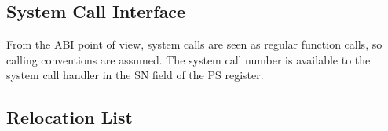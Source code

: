 \subsection{System Call Interface}

From the ABI point of view, system calls are seen as regular function calls, so
calling conventions are assumed. The system call number is available to the
system call handler in the SN field of the PS register.


\subsection{Relocation List}

\begin{center}

\end{center}




%




